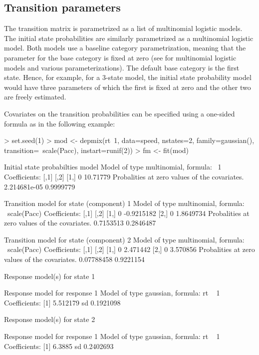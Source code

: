 \documentclass[article]{jss}
\begin{document}
\subsection{Transition parameters}

The transition matrix is parametrized as a list of multinomial
logistic models.  The initial state probabilities are similarly
parametrized as a multinomial logistic model.  Both models use a
baseline category parametrization, meaning that the parameter for the
base category is fixed at zero (see \citet[see][p.\ 267
ff.]{Agresti2002} for multinomial logistic models and various
parameterizations).  The default base category is the first state.
Hence, for example, for a 3-state model, the initial state probability
model would have three parameters of which the first is fixed at zero
and the other two are freely estimated.

Covariates on the transition probabilities can be specified using a
one-sided formula as in the following example:
\begin{CodeChunk}
\begin{CodeInput}
> set.seed(1)
> mod <- depmix(rt~1, data=speed, nstates=2, family=gaussian(), 
  transition=~scale(Pacc), instart=runif(2))
> fm <- fit(mod)
\end{CodeInput}
\begin{CodeOutput}
Initial state probabilties model 
Model of type multinomial, formula: ~1
Coefficients: 
	 [,1]     [,2]
[1,]    0 10.71779
Probalities at zero values of the covariates.
2.214681e-05 0.9999779 

Transition model for state (component) 1 
Model of type multinomial, formula: ~scale(Pacc)
Coefficients: 
	 [,1]       [,2]
[1,]    0 -0.9215182
[2,]    0  1.8649734
Probalities at zero values of the covariates.
0.7153513 0.2846487 

Transition model for state (component) 2 
Model of type multinomial, formula: ~scale(Pacc)
Coefficients: 
	 [,1]     [,2]
[1,]    0 2.471442
[2,]    0 3.570856
Probalities at zero values of the covariates.
0.07788458 0.9221154 

Response model(s) for state 1 

Response model for response 1 
Model of type gaussian, formula: rt ~ 1
Coefficients: 
[1] 5.512179
sd  0.1921098 

Response model(s) for state 2 

Response model for response 1 
Model of type gaussian, formula: rt ~ 1
Coefficients: 
[1] 6.3885
sd  0.2402693 
\end{CodeOutput}
\end{CodeChunk}
\end{document}
